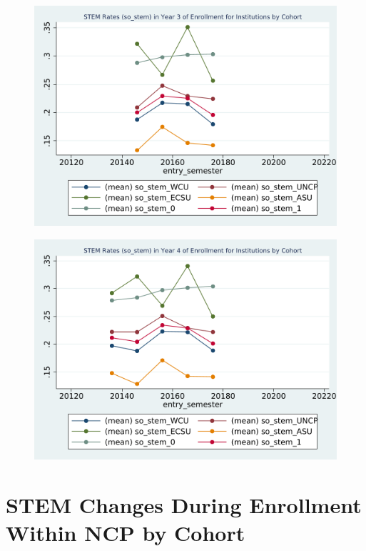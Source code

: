 \begin{figure}[h!]
\begin{centering}
\includegraphics[scale=1]{"figures/so_stem_by_entry_3_INSTITUTION_STEM"}
\end{centering}
\end{figure}
\newpage
\begin{figure}[h!]
\begin{centering}
\includegraphics[scale=1]{"figures/so_stem_by_entry_4_INSTITUTION_STEM"}
\end{centering}
\end{figure}

\section{STEM Changes During Enrollment Within NCP by Cohort}

